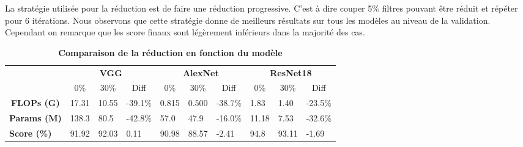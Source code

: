 \documentclass[12pt]{article}
\begin{document}
La stratégie utilisée pour la réduction est de faire une réduction progressive. C'est à dire couper 5\% filtres pouvant être réduit et répéter pour 6 itérations. Nous observons que cette stratégie donne de meilleurs résultats sur tous les modèles au niveau de la validation. Cependant on remarque que les score finaux sont légèrement inférieurs dans la majorité des cas.
\begin{table}[H]
	\caption {\textbf{Comparaison de la réduction en fonction du modèle}}
\begin{tabular}{cccccccccc}
	\multicolumn{1}{l}{\textbf{}}           & \multicolumn{3}{c}{\textbf{VGG}}                                                                            & \multicolumn{3}{c}{\textbf{AlexNet}}                                                                        & \multicolumn{3}{c}{\textbf{ResNet18}}                                                                      \\
	\multicolumn{1}{l}{}                    & 0\%                       & 30\%                      & Diff                                                & 0\%                       & 30\%                      & Diff                                                & 0\%                       & 30\%                      & Diff                                               \\ \cline{2-10} 
	\multicolumn{1}{c|}{\textbf{FLOPs (G)}}  & \multicolumn{1}{l}{17.31} & \multicolumn{1}{l}{10.55} & \multicolumn{1}{l|}{{\color[HTML]{009901} -39.1\%}} & \multicolumn{1}{l}{0.815} & \multicolumn{1}{l}{0.500} & \multicolumn{1}{l|}{{\color[HTML]{009901} -38.7\%}} & \multicolumn{1}{l}{1.83}  & \multicolumn{1}{l}{1.40}  & \multicolumn{1}{l}{{\color[HTML]{009901} -23.5\%}} \\
	\multicolumn{1}{c|}{\textbf{Params (M)}} & \multicolumn{1}{l}{138.3} & \multicolumn{1}{l}{80.5}  & \multicolumn{1}{l|}{{\color[HTML]{009901} -42.8\%}} & \multicolumn{1}{l}{57.0}  & \multicolumn{1}{l}{47.9}  & \multicolumn{1}{l|}{{\color[HTML]{009901} -16.0\%}} & \multicolumn{1}{l}{11.18} & \multicolumn{1}{l}{7.53}  & \multicolumn{1}{l}{{\color[HTML]{009901} -32.6\%}} \\
	\multicolumn{1}{l|}{\textbf{Score (\%)}} & \multicolumn{1}{l}{91.92} & \multicolumn{1}{l}{92.03} & \multicolumn{1}{l|}{{\color[HTML]{009901} 0.11}}    & \multicolumn{1}{l}{90.98} & \multicolumn{1}{l}{88.57} & \multicolumn{1}{l|}{{\color[HTML]{9A0000} -2.41}}   & \multicolumn{1}{l}{94.8}  & \multicolumn{1}{l}{93.11} & \multicolumn{1}{l}{{\color[HTML]{9A0000} -1.69}}   \\ \hline

\end{tabular}
\end{table}
\end{document}
